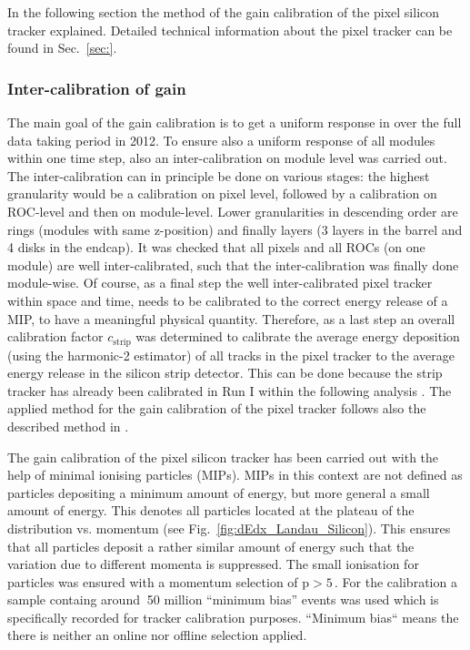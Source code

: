In the following section the method of the gain calibration of the pixel silicon tracker explained. 
Detailed technical information about the pixel tracker can be found in Sec.~\ref{sec:}.


\subsubsection*{Inter-calibration of gain}
The main goal of the gain calibration is to get a uniform response in \dedx over the full data taking period in 2012.
To ensure also a uniform response of all modules within one time step, also an inter-calibration on module level was carried out.
The inter-calibration can in principle be done on various stages: the highest granularity would be a calibration on pixel level, followed by a calibration on ROC-level and then on module-level.
Lower granularities in descending order are rings (modules with same z-position) and finally layers (3 layers in the barrel and 4 disks in the endcap). 
It was checked that all pixels and all ROCs (on one module) are well inter-calibrated, such that the inter-calibration was finally done module-wise.
Of course, as a final step the well inter-calibrated pixel tracker within space and time, needs to be calibrated to the correct energy release of a MIP, to have a meaningful physical quantity.
Therefore, as a last step an overall calibration factor $c_{\text{strip}}$ was determined to calibrate the average energy deposition (using the harmonic-2 estimator) of all tracks in the pixel tracker to the average energy release 
in the silicon strip detector.
This can be done because the strip tracker has already been calibrated in Run I within the following analysis \cite{bib:CMS:HSCP_8TeV}.
The applied method for the gain calibration of the pixel tracker follows also the described method in \cite{bib:Quertenmont_2010}.

The gain calibration of the pixel silicon tracker has been carried out with the help of minimal ionising particles (MIPs).
MIPs in this context are not defined as particles depositing a minimum amount of energy, but more general a small amount of energy.
This denotes all particles located at the plateau of the \dedx distribution vs. momentum (see Fig.~\ref{fig:dEdx_Landau_Silicon}).
This ensures that all particles deposit a rather similar amount of energy such that the variation due to different momenta is suppressed.
The small ionisation for particles was ensured with a momentum selection of p$>5\,$\gev.
For the calibration a sample containg around $~$50 million ``minimum bias'' events was used which is specifically recorded for tracker calibration purposes.
``Minimum bias`` means the there is neither an online nor offline selection applied. 


